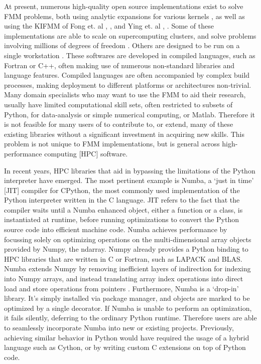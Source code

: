 \documentclass{IEEEcsmag}
\begin{document}
At present, numerous high-quality open source implementations exist to solve FMM problems, both using analytic expansions for various kernels \cite{Gimbutas2010}, as well as using the KIFMM of Fong et. al \cite{Bramas2020}, \cite{Agullo2016}, and Ying et. al \cite{Wang2021}, \cite{Lashuk2012}. Some of these implementations are able to scale on supercomputing clusters, and solve problems involving millions of degrees of freedom \cite{Lashuk2012}. Others are designed to be run on a single workstation \cite{Bramas2020, Wang2021}. These softwares are developed in compiled languages, such as Fortran or C++, often making use of numerous non-standard libraries and language features. Compiled languages are often accompanied by complex build processes, making deployment to different platforms or architectures non-trivial. Many domain specialists who may want to use the FMM to aid their research, usually have limited computational skill sets, often restricted to subsets of Python, for data-analysis or simple numerical computing, or Matlab. Therefore it is not feasible for many users of to contribute to, or extend, many of these existing libraries without a significant investment in acquiring new skills. This problem is not unique to FMM implementations, but is general across high-performance computing [HPC] software.

In recent years, HPC libraries that aid in bypassing the limitations of the Python interpreter have emerged. The most pertinent example is Numba, a `just in time' [JIT] compiler for CPython, the most commonly used implementation of the Python interpreter written in the C language. JIT refers to the fact that the compiler waits until a Numba enhanced object, either a function or a class, is instantiated at runtime, before running optimizations to convert the Python source code into efficient machine code. Numba achieves performance by focussing solely on optimizing operations on the multi-dimensional array objects provided by Numpy, the ndarray. Numpy already provides a Python binding to HPC libraries that are written in C or Fortran, such as LAPACK and BLAS. Numba extends Numpy by removing inefficient layers of indirection for indexing into Numpy arrays, and instead translating array index operations into direct load and store operations from pointers \cite{Lam2015}. Furthermore, Numba is a `drop-in' library. It's simply installed via package manager, and objects are marked to be optimized by a single decorator. If Numba is unable to perform an optimization, it fails silently, deferring to the ordinary Python runtime. Therefore users are able to seamlessly incorporate Numba into new or existing projects. Previously, achieving similar behavior in Python would have required the usage of a hybrid language such as Cython, or by writing custom C extensions on top of Python code.
\end{document}
